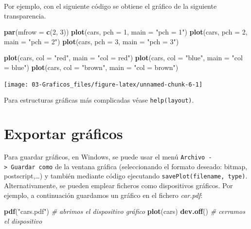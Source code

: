\documentclass[]{book}
\newenvironment{Shaded}{\begin{snugshade}}{\end{snugshade}}
\newcommand{\KeywordTok}[1]{\textcolor[rgb]{0.13,0.29,0.53}{\textbf{#1}}}
\newcommand{\DataTypeTok}[1]{\textcolor[rgb]{0.13,0.29,0.53}{#1}}
\newcommand{\DecValTok}[1]{\textcolor[rgb]{0.00,0.00,0.81}{#1}}
\newcommand{\StringTok}[1]{\textcolor[rgb]{0.31,0.60,0.02}{#1}}
\newcommand{\CommentTok}[1]{\textcolor[rgb]{0.56,0.35,0.01}{\textit{#1}}}
\newcommand{\NormalTok}[1]{#1}
\begin{document}
Por ejemplo, con el siguiente código se obtiene el gráfico de la
siguiente transparencia.

\begin{Shaded}
\begin{Highlighting}[]
\KeywordTok{par}\NormalTok{(}\DataTypeTok{mfrow =} \KeywordTok{c}\NormalTok{(}\DecValTok{2}\NormalTok{, }\DecValTok{3}\NormalTok{))}
\KeywordTok{plot}\NormalTok{(cars, }\DataTypeTok{pch =} \DecValTok{1}\NormalTok{, }\DataTypeTok{main =} \StringTok{"pch = 1"}\NormalTok{)}
\KeywordTok{plot}\NormalTok{(cars, }\DataTypeTok{pch =} \DecValTok{2}\NormalTok{, }\DataTypeTok{main =} \StringTok{"pch = 2"}\NormalTok{)}
\KeywordTok{plot}\NormalTok{(cars, }\DataTypeTok{pch =} \DecValTok{3}\NormalTok{, }\DataTypeTok{main =} \StringTok{"pch = 3"}\NormalTok{)}

\KeywordTok{plot}\NormalTok{(cars, }\DataTypeTok{col =} \StringTok{"red"}\NormalTok{, }\DataTypeTok{main =} \StringTok{"col = red"}\NormalTok{)}
\KeywordTok{plot}\NormalTok{(cars, }\DataTypeTok{col =} \StringTok{"blue"}\NormalTok{, }\DataTypeTok{main =} \StringTok{"col = blue"}\NormalTok{)}
\KeywordTok{plot}\NormalTok{(cars, }\DataTypeTok{col =} \StringTok{"brown"}\NormalTok{, }\DataTypeTok{main =} \StringTok{"col = brown"}\NormalTok{)}
\end{Highlighting}
\end{Shaded}

\begin{center}\texttt{[image: 03-Graficos\_files/figure-latex/unnamed-chunk-6-1]} \end{center}

Para estructuras gráficas más complicadas véase \texttt{help(layout)}.

\section{Exportar gráficos}\label{exportar-graficos}

Para guardar gráficos, en Windows, se puede usar el menú
\texttt{Archivo\ -\textgreater{}\ Guardar\ como} de la ventana gráfica
(seleccionando el formato deseado: bitmap, postscript,\ldots{}) y
también mediante código ejecutando \texttt{savePlot(filename,\ type)}.
Alternativamente, se pueden emplear ficheros como dispositivos gráficos.
Por ejemplo, a continuación guardamos un gráfico en el fichero
\emph{car.pdf}:

\begin{Shaded}
\begin{Highlighting}[]
\KeywordTok{pdf}\NormalTok{(}\StringTok{"cars.pdf"}\NormalTok{)   }\CommentTok{# abrimos el dispositivo gráfico}
\KeywordTok{plot}\NormalTok{(cars)}
\KeywordTok{dev.off}\NormalTok{()         }\CommentTok{# cerramos el dispositivo}
\end{Highlighting}
\end{Shaded}
\end{document}
